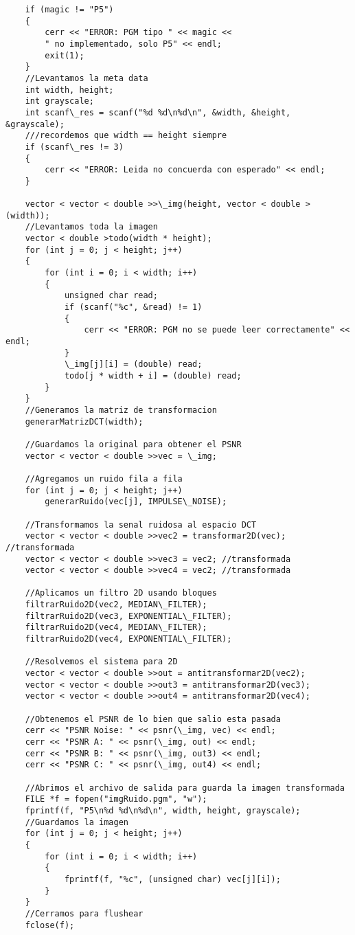 \begin{lstlisting}
    if (magic != "P5")
    {
        cerr << "ERROR: PGM tipo " << magic <<
        " no implementado, solo P5" << endl;
        exit(1);
    }
    //Levantamos la meta data
    int width, height;
    int grayscale;
    int scanf\_res = scanf("%d %d\n%d\n", &width, &height, &grayscale);
    ///recordemos que width == height siempre
    if (scanf\_res != 3)
    {
        cerr << "ERROR: Leida no concuerda con esperado" << endl;
    }

    vector < vector < double >>\_img(height, vector < double >(width));
    //Levantamos toda la imagen
    vector < double >todo(width * height);
    for (int j = 0; j < height; j++)
    {
        for (int i = 0; i < width; i++)
        {
            unsigned char read;
            if (scanf("%c", &read) != 1)
            {
                cerr << "ERROR: PGM no se puede leer correctamente" << endl;
            }
            \_img[j][i] = (double) read;
            todo[j * width + i] = (double) read;
        }
    }
    //Generamos la matriz de transformacion
    generarMatrizDCT(width);

    //Guardamos la original para obtener el PSNR
    vector < vector < double >>vec = \_img;

    //Agregamos un ruido fila a fila
    for (int j = 0; j < height; j++)
        generarRuido(vec[j], IMPULSE\_NOISE);

    //Transformamos la senal ruidosa al espacio DCT
    vector < vector < double >>vec2 = transformar2D(vec);	//transformada
    vector < vector < double >>vec3 = vec2;	//transformada
    vector < vector < double >>vec4 = vec2;	//transformada

    //Aplicamos un filtro 2D usando bloques
    filtrarRuido2D(vec2, MEDIAN\_FILTER);
    filtrarRuido2D(vec3, EXPONENTIAL\_FILTER);
    filtrarRuido2D(vec4, MEDIAN\_FILTER);
    filtrarRuido2D(vec4, EXPONENTIAL\_FILTER);

    //Resolvemos el sistema para 2D
    vector < vector < double >>out = antitransformar2D(vec2);
    vector < vector < double >>out3 = antitransformar2D(vec3);
    vector < vector < double >>out4 = antitransformar2D(vec4);

    //Obtenemos el PSNR de lo bien que salio esta pasada
    cerr << "PSNR Noise: " << psnr(\_img, vec) << endl;
    cerr << "PSNR A: " << psnr(\_img, out) << endl;
    cerr << "PSNR B: " << psnr(\_img, out3) << endl;
    cerr << "PSNR C: " << psnr(\_img, out4) << endl;

    //Abrimos el archivo de salida para guarda la imagen transformada
    FILE *f = fopen("imgRuido.pgm", "w");
    fprintf(f, "P5\n%d %d\n%d\n", width, height, grayscale);
    //Guardamos la imagen
    for (int j = 0; j < height; j++)
    {
        for (int i = 0; i < width; i++)
        {
            fprintf(f, "%c", (unsigned char) vec[j][i]);
        }
    }
    //Cerramos para flushear
    fclose(f);


\end{lstlisting}
